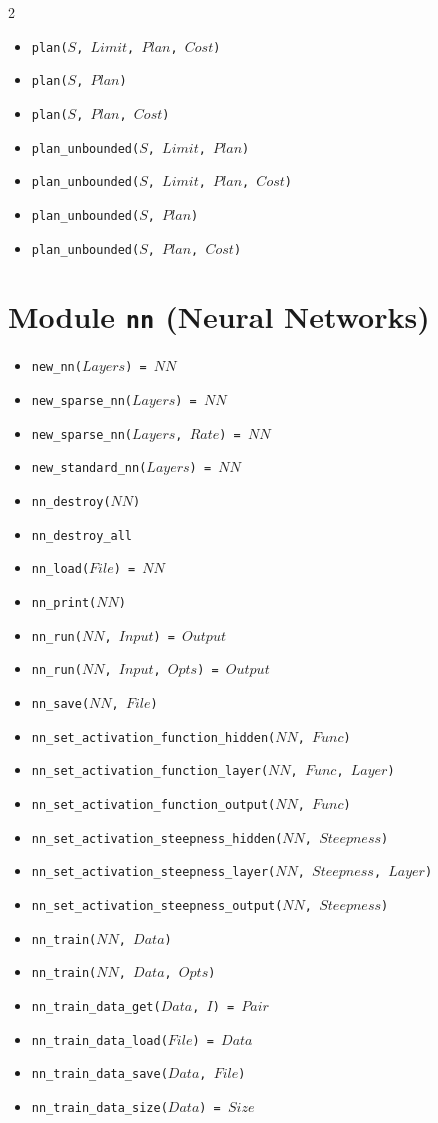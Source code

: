 \documentclass[10pt]{article}
\begin{document}
\begin{multicols}{2}
\begin{scriptsize}
\begin{itemize}
\item \texttt{plan($S$, $Limit$, $Plan$, $Cost$)}
\item \texttt{plan($S$, $Plan$)}
\item \texttt{plan($S$, $Plan$, $Cost$)}
\item \texttt{plan\_unbounded($S$, $Limit$, $Plan$)}
\item \texttt{plan\_unbounded($S$, $Limit$, $Plan$, $Cost$)}
\item \texttt{plan\_unbounded($S$, $Plan$)}
\item \texttt{plan\_unbounded($S$, $Plan$, $Cost$)}
\end{itemize}
\end{scriptsize}
\section*{Module \texttt{nn} (Neural Networks)}
\begin{scriptsize}
\begin{itemize}
\item \texttt{new\_nn($Layers$) = $NN$}
\item \texttt{new\_sparse\_nn($Layers$) = $NN$}
\item \texttt{new\_sparse\_nn($Layers$, $Rate$) = $NN$}
\item \texttt{new\_standard\_nn($Layers$) = $NN$}
\item \texttt{nn\_destroy($NN$)}
\item \texttt{nn\_destroy\_all}
\item \texttt{nn\_load($File$) = $NN$}
\item \texttt{nn\_print($NN$)}
\item \texttt{nn\_run($NN$, $Input$) = $Output$}
\item \texttt{nn\_run($NN$, $Input$, $Opts$) = $Output$}
\item \texttt{nn\_save($NN$, $File$)}
\item \texttt{nn\_set\_activation\_function\_hidden($NN$, $Func$)}
\item \texttt{nn\_set\_activation\_function\_layer($NN$, $Func$, $Layer$)}
\item \texttt{nn\_set\_activation\_function\_output($NN$, $Func$)}
\item \texttt{nn\_set\_activation\_steepness\_hidden($NN$, $Steepness$)}
\item \texttt{nn\_set\_activation\_steepness\_layer($NN$, $Steepness$, $Layer$)}
\item \texttt{nn\_set\_activation\_steepness\_output($NN$, $Steepness$)}
\item \texttt{nn\_train($NN$, $Data$)}
\item \texttt{nn\_train($NN$, $Data$, $Opts$)}
\item \texttt{nn\_train\_data\_get($Data$, $I$) = $Pair$}
\item \texttt{nn\_train\_data\_load($File$) = $Data$}
\item \texttt{nn\_train\_data\_save($Data$, $File$)}
\item \texttt{nn\_train\_data\_size($Data$) = $Size$}
\end{itemize}
\end{scriptsize}

\end{multicols}
\end{document}
